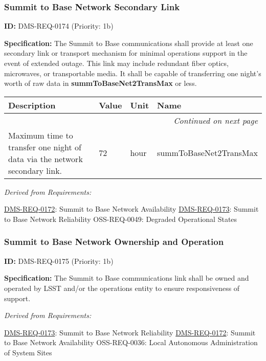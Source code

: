 \documentclass[SE,toc,lsstdraft]{lsstdoc}
\makeatletter
\newcommand{\paramname}[1]{\hspace{0pt}#1}
\newcommand{\unitname}[1]{\hspace{0pt}#1}
\newenvironment{parameters}[0]{%
\setlength\LTleft{0pt}
\setlength\LTright{\fill}
\begin{small}
\begin{longtable}[]{|p{0.49\textwidth}|l|p{0.6in}|p{1.70in}@{}|}

\hline \textbf{Description} & \textbf{Value} & \textbf{Unit} & \textbf{Name} \\ \hline
\endhead

\hline \multicolumn{4}{r}{\emph{Continued on next page}} \\
\endfoot

\hline\hline
\endlastfoot
}{%
\hline
\end{longtable}
\end{small}
}
\makeatother
\begin{document}
\subsubsection{Summit to Base Network Secondary Link}

\label{DMS-REQ-0174}
\textbf{ID:} DMS-REQ-0174 (Priority: 1b)

\textbf{Specification:} The Summit to Base communications shall provide at least one secondary link or transport mechanism for minimal operations support in the event of extended outage.  This link may include redundant fiber optics, microwaves, or transportable media.  It shall be capable of transferring one night's worth of raw data in \textbf{summToBaseNet2TransMax }or less.

\begin{parameters}
Maximum time to transfer one night of data via the network secondary link.
&
72
&
\unitname{%
hour
}
&
\paramname{%
summToBaseNet2TransMax
} \\\hline
\end{parameters}

\emph{Derived from Requirements:}

\hyperref[DMS-REQ-0172]{DMS-REQ-0172}:
Summit to Base Network Availability \newline
\hyperref[DMS-REQ-0173]{DMS-REQ-0173}:
Summit to Base Network Reliability \newline
OSS-REQ-0049:
Degraded Operational States \newline

\subsubsection{Summit to Base Network Ownership and Operation}

\label{DMS-REQ-0175}
\textbf{ID:} DMS-REQ-0175 (Priority: 1b)

\textbf{Specification:} The Summit to Base communications link shall be owned and operated by LSST and/or the operations entity to ensure responsiveness of support.

\emph{Derived from Requirements:}

\hyperref[DMS-REQ-0173]{DMS-REQ-0173}:
Summit to Base Network Reliability \newline
\hyperref[DMS-REQ-0172]{DMS-REQ-0172}:
Summit to Base Network Availability \newline
OSS-REQ-0036:
Local Autonomous Administration of System Sites \newline
\end{document}
